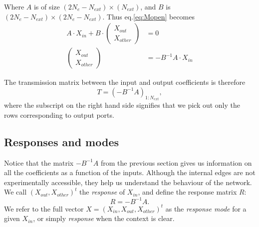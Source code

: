 Where $A$ is of size $(2N_e-N_{ext}) \times (N_{ext})$, and $B$ is $(2N_e-N_{ext}) \times (2N_e-N_{ext})$. Thus eq.\ref{eq:Mopen} becomes
\begin{subequations}
\begin{align}
    A\cdot X_{in} + B\cdot \begin{pmatrix}X_{out}\\X_{other}  \end{pmatrix}  &= 0 \\
    \begin{pmatrix}X_{out}\\X_{other}  \end{pmatrix} &= -B^{-1}A \cdot X_{in}
\end{align}
\end{subequations}

The transmission matrix between the input and output coefficients is therefore 
\begin{equation}
    \label{eq:T}
    T = (-B^{-1}A)_{1:N_{ext}},
\end{equation}
where the subscript on the right hand side signifies that we pick out only the rows corresponding to output ports.

\subsection{Responses and modes}
Notice that the matrix $-B^{-1}A$ from the previous section gives us information on all the coefficients as a function of the inputs. Although the internal edges are not experimentally accessible, they help us understand the behaviour of the network. We call $(X_{out},X_{other})^t$ the \textit{response} of $X_{in}$, and define the response matrix $R$:
\begin{equation}
    \label{eq:R}
    R = -B^{-1}A.
\end{equation}
We refer to the full vector $X=(X_{in},X_{out},X_{other})^t$ as the \textit{response mode} for a given $X_{in}$, or simply \textit{response} when the context is clear.

